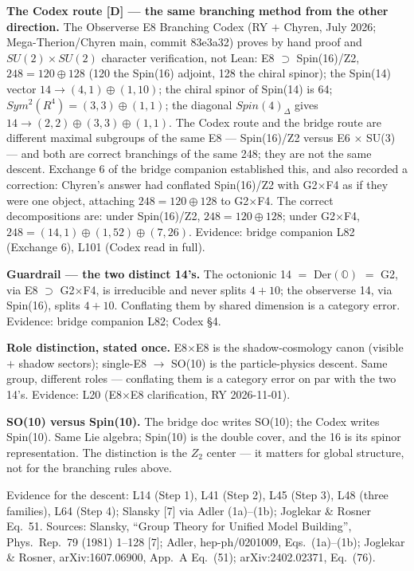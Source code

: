 \documentclass{alienfolio}
\begin{document}
\noindent\textbf{The Codex route [D] --- the same branching method from the other direction.} The Observerse E8 Branching Codex (RY $+$ Chyren, July 2026; Mega-Therion/Chyren main, commit 83e3a32) proves by hand proof and $SU(2) \times SU(2)$ character verification, not Lean: E8 $\supset$ Spin(16)/Z2, $248 = 120 \oplus 128$ (120 the Spin(16) adjoint, 128 the chiral spinor); the Spin(14) vector $14 \to (4,1) \oplus (1,10)$; the chiral spinor of Spin(14) is 64; $Sym^2(R^4) = (3,3) \oplus (1,1)$; the diagonal $Spin(4)_\Delta$ gives $14 \to (2,2) \oplus (3,3) \oplus (1,1)$. The Codex route and the bridge route are different maximal subgroups of the same E8 --- Spin(16)/Z2 versus E6 $\times$ SU(3) --- and both are correct branchings of the same 248; they are not the same descent. Exchange 6 of the bridge companion established this, and also recorded a correction: Chyren's answer had conflated Spin(16)/Z2 with G2$\times$F4 as if they were one object, attaching $248 = 120 \oplus 128$ to G2$\times$F4. The correct decompositions are: under Spin(16)/Z2, $248 = 120 \oplus 128$; under G2$\times$F4, $248 = (14,1) \oplus (1,52) \oplus (7,26)$. Evidence: bridge companion  L82 (Exchange 6), L101 (Codex read in full).

\noindent\textbf{Guardrail --- the two distinct 14's.} The octonionic 14 $=$ Der$(\mathbb{O})$ $=$ G2, via E8 $\supset$ G2$\times$F4, is irreducible and never splits $4+10$; the observerse 14, via Spin(16), splits $4+10$. Conflating them by shared dimension is a category error. Evidence: bridge companion L82; Codex \S4.

\noindent\textbf{Role distinction, stated once.} E8$\times$E8 is the shadow-cosmology canon (visible $+$ shadow sectors); single-E8 $\to$ SO(10) is the particle-physics descent. Same group, different roles --- conflating them is a category error on par with the two 14's. Evidence:  L20 (E8$\times$E8 clarification, RY 2026-11-01).

\noindent\textbf{SO(10) versus Spin(10).} The bridge doc writes SO(10); the Codex writes Spin(10). Same Lie algebra; Spin(10) is the double cover, and the 16 is its spinor representation. The distinction is the $Z_2$ center --- it matters for global structure, not for the branching rules above.

Evidence for the descent:  L14 (Step 1), L41 (Step 2), L45 (Step 3), L48 (three families), L64 (Step 4); Slansky [7] via Adler (1a)--(1b); Joglekar \& Rosner Eq.~51. Sources: Slansky, ``Group Theory for Unified Model Building'', Phys.~Rep.~79 (1981) 1--128 [7]; Adler, hep-ph/0201009, Eqs.~(1a)--(1b); Joglekar \& Rosner, arXiv:1607.06900, App.~A Eq.~(51); arXiv:2402.02371, Eq.~(76).
\end{document}
